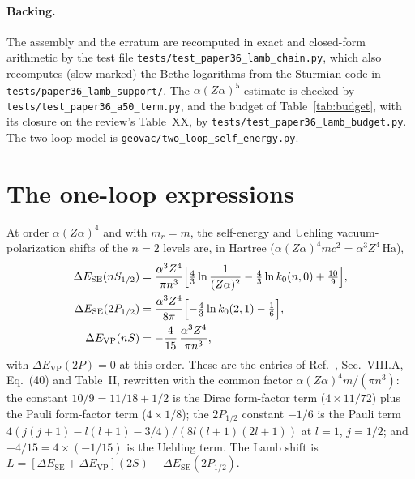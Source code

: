 \documentclass[11pt]{article}
\begin{document}
\paragraph*{Backing.}
\sloppy
The assembly and the erratum are recomputed in exact and closed-form
arithmetic by the test file
\texttt{tests/test\_paper36\_lamb\_chain.py}, which also recomputes
(slow-marked) the Bethe logarithms from the Sturmian code in
\texttt{tests/paper36\_lamb\_support/}.  The $\alpha(Z\alpha)^5$
estimate is checked by \texttt{tests/test\_paper36\_a50\_term.py}, and
the budget of Table~\ref{tab:budget}, with its closure on the review's
Table~XX, by \texttt{tests/test\_paper36\_lamb\_budget.py}.  The
two-loop model is \texttt{geovac/two\_loop\_self\_energy.py}.\par
\fussy

\section{The one-loop expressions}
\label{sec:oneloop}

At order $\alpha(Z\alpha)^4$ and with $m_r = m$, the self-energy and
Uehling vacuum-polarization shifts of the $n=2$ levels are, in Hartree
($\alpha(Z\alpha)^4 m c^2 = \alpha^3 Z^4\,\mathrm{Ha}$),
\begin{align}
\label{eq:eides_se}
\Delta E_\text{SE}(nS_{1/2}) &= \frac{\alpha^3 Z^4}{\pi n^3}
\Bigl[\tfrac{4}{3} \ln\frac{1}{(Z\alpha)^2}
- \tfrac{4}{3} \ln k_0(n, 0) + \tfrac{10}{9}\Bigr], \\
\label{eq:eides_se_2p}
\Delta E_\text{SE}(2P_{1/2}) &= \frac{\alpha^3 Z^4}{8\pi}
\Bigl[- \tfrac{4}{3} \ln k_0(2, 1) - \tfrac{1}{6}\Bigr], \\
\label{eq:uehling_vp}
\Delta E_\text{VP}(nS) &= -\frac{4}{15}\,\frac{\alpha^3 Z^4}{\pi n^3},
\end{align}
with $\Delta E_\text{VP}(2P) = 0$ at this order.  These are the entries
of Ref.~\cite{eides2001}, Sec.~VIII.A, Eq.~(40) and Table~II, rewritten
with the common factor $\alpha(Z\alpha)^4 m/(\pi n^3)$: the constant
$10/9 = 11/18 + 1/2$ is the Dirac form-factor term ($4 \times 11/72$)
plus the Pauli form-factor term ($4 \times 1/8$); the $2P_{1/2}$
constant $-1/6$ is the Pauli term $4(j(j+1) - l(l+1) - 3/4)/
(8l(l+1)(2l+1))$ at $l = 1$, $j = 1/2$; and $-4/15 = 4 \times (-1/15)$
is the Uehling term.  The Lamb shift is
$L = [\Delta E_\text{SE} + \Delta E_\text{VP}](2S) -
\Delta E_\text{SE}(2P_{1/2})$.
\end{document}
